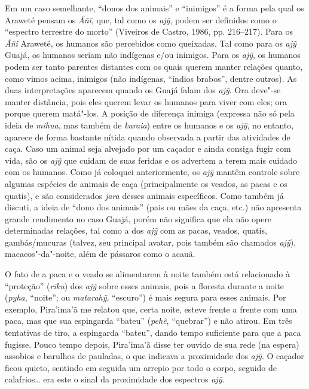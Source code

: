 Em um caso semelhante, ``donos dos animais'' e ``inimigos'' é a forma pela
qual os Araweté pensam os \emph{Ãñĩ}, que, tal como os \emph{ajỹ}, podem
ser definidos como o ``espectro terrestre do morto'' (Viveiros de Castro,
1986, pp. 216--217). Para os \emph{Ãñĩ} Araweté, os humanos são percebidos
como queixadas. Tal como para os \emph{ajỹ} Guajá, os humanos seriam não
indígenas e/ou inimigos. Para os \emph{ajỹ}, os humanos podem ser tanto
parentes distantes com os quais querem manter relações quanto, como
vimos acima, inimigos (não indígenas, ``índios brabos'', dentre outros).
As duas interpretações aparecem quando os Guajá falam dos \emph{ajỹ}.
Ora deve"-se manter distância, pois eles querem levar os humanos para
viver com eles; ora porque querem matá"-los. A posição de diferença
inimiga (expressa não só pela ideia de \emph{mihua}, mas também de
\emph{karaia}) entre os humanos e os \emph{ajỹ}, no entanto, aparece de
forma bastante nítida quando observada a partir das atividades de caça.
Caso um animal seja alvejado por um caçador e ainda consiga fugir com
vida, são os \emph{ajỹ} que cuidam de suas feridas e os advertem a terem
mais cuidado com os humanos. Como já coloquei anteriormente, os
\emph{ajỹ} mantêm controle sobre algumas espécies de animais de caça
(principalmente os veados, as pacas e os quatis), e são considerados
\emph{jara} desses animais específicos. Como também já discuti, a ideia
de ``dono dos animais'' (pais ou mães da caça, etc.) não apresenta grande
rendimento no caso Guajá, porém não significa que ela não opere
determinadas relações, tal como a dos \emph{ajỹ} com as pacas, veados,
quatis, gambás/mucuras (talvez, seu principal avatar, pois também são
chamados \emph{ajỹ}), macacos"-da"-noite, além de pássaros como o acauã.

O fato de a paca e o veado se alimentarem à noite também está
relacionado à ``proteção'' (\emph{riku}) dos \emph{ajỹ} sobre esses
animais, pois a floresta durante a noite (\emph{pyha}, ``noite''; ou
\emph{matarahỹ}, ``escuro'') é mais segura para esses animais. Por
exemplo, Pira'ima'ã me relatou que, certa noite, esteve frente a frente
com uma paca, mas que sua espingarda ``bateu'' (\emph{pehẽ}, ``quebrar'') e
não atirou. Em três tentativas de tiro, a espingarda ``bateu'', dando
tempo suficiente para que a paca fugisse. Pouco tempo depois, Pira'ima'ã
disse ter ouvido de sua rede (na espera) assobios e barulhos de
pauladas, o que indicava a proximidade dos \emph{ajỹ}. O caçador ficou
quieto, sentindo em seguida um arrepio por todo o corpo, seguido de
calafrios\ldots{} era este o sinal da proximidade dos espectros \emph{ajỹ}.

